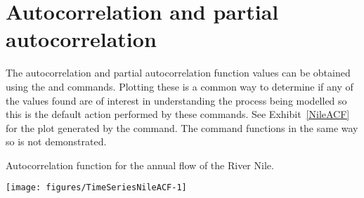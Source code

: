  
 
\section{Autocorrelation and partial autocorrelation} 
 
 
The autocorrelation and partial autocorrelation function values can be obtained using the  and  commands. Plotting these is a common way to determine if any of the values found are of interest in understanding the process being modelled so this is the default action performed by these commands. See Exhibit~\ref{NileACF} for the plot generated by the  command. The  command functions in the same way so is not demonstrated. 
\begin{exhibit} 
\begin{center} 
\caption{Autocorrelation function for the annual flow of the River Nile.} 
\label{NileACF} 
\begin{knitrout}
\color{fgcolor}\begin{kframe}
\begin{alltt}
\hlstd{> }
\end{alltt}
\end{kframe}
\texttt{[image: figures/TimeSeriesNileACF-1]} 

\end{knitrout}
\end{center} 
\end{exhibit} 
 
